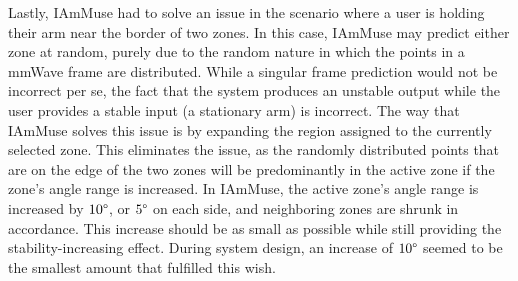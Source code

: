 Lastly, IAmMuse had to solve an issue in the scenario where a user is holding their arm near the border of two zones.
In this case, IAmMuse may predict either zone at random, purely due to the random nature in which the points in a mmWave frame are distributed.
While a singular frame prediction would not be incorrect per se, the fact that the system produces an unstable output while the user provides a stable input (a stationary arm) is incorrect.
The way that IAmMuse solves this issue is by expanding the region assigned to the currently selected zone.
This eliminates the issue, as the randomly distributed points that are on the edge of the two zones will be predominantly in the active zone if the zone's angle range is increased.
In IAmMuse, the active zone's angle range is increased by $10\degree$, or $5\degree$ on each side, and neighboring zones are shrunk in accordance.
This increase should be as small as possible while still providing the stability-increasing effect.
During system design, an increase of $10\degree$ seemed to be the smallest amount that fulfilled this wish.





